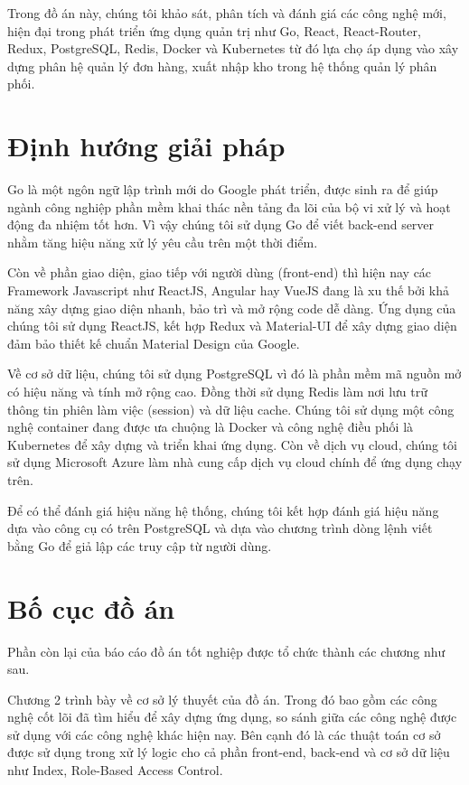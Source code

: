 Trong đồ án này, chúng tôi khảo sát, phân tích và đánh giá các công
nghệ mới, hiện đại trong phát triển ứng dụng quản trị như Go,
React, React-Router, Redux, PostgreSQL, Redis, Docker và Kubernetes
từ đó lựa chọ áp dụng vào xây dựng phân hệ quản lý đơn hàng,
xuất nhập kho trong hệ thống quản lý phân phối.

\section{Định hướng giải pháp}
Go là một ngôn ngữ lập trình mới do Google phát triển,
được sinh ra để giúp ngành công nghiệp phần mềm khai thác nền
tảng đa lõi của bộ vi xử lý và hoạt động đa nhiệm tốt hơn.
Vì vậy chúng tôi sử dụng Go để viết back-end server nhằm tăng hiệu
năng xử lý yêu cầu trên một thời điểm.

Còn về phần giao diện, giao tiếp với người dùng (front-end) thì hiện
nay các Framework Javascript như ReactJS, Angular hay VueJS đang
là xu thế bởi khả năng xây dựng giao diện nhanh, bảo trì và
mở rộng code dễ dàng. Ứng dụng của chúng tôi sử dụng ReactJS, kết hợp Redux và
Material-UI để xây dựng giao diện đảm bảo thiết kế
chuẩn Material Design của Google. 

Về cơ sở dữ liệu, chúng tôi sử dụng PostgreSQL vì đó là phần mềm mã nguồn
mở có hiệu năng và tính mở rộng cao. Đồng thời sử dụng Redis làm nơi lưu
trữ thông tin phiên làm việc (session) và dữ liệu cache.
Chúng tôi sử dụng một công nghệ container đang được
ưa chuộng là Docker và công nghệ điều phối là Kubernetes để xây dựng
và triển khai ứng dụng. Còn về dịch vụ cloud, chúng tôi sử dụng Microsoft
Azure làm nhà cung cấp dịch vụ cloud chính để ứng dụng chạy trên.

Để có thể đánh giá hiệu năng hệ thống, chúng tôi kết hợp đánh giá hiệu năng
dựa vào công cụ có trên PostgreSQL và dựa vào chương trình dòng lệnh viết
bằng Go để giả lập các truy cập từ người dùng.

\section{Bố cục đồ án}
Phần còn lại của báo cáo đồ án tốt nghiệp được tổ
chức thành các chương như sau.

Chương 2 trình bày về cơ sở lý thuyết của đồ án. Trong đó bao gồm
các công nghệ cốt lõi đã tìm hiểu để xây dựng ứng dụng, so sánh
giữa các công nghệ được sử dụng với các công nghệ khác hiện nay.
Bên cạnh đó là các thuật toán cơ sở được sử dụng trong xử lý logic
cho cả phần front-end, back-end và cơ sở dữ liệu như Index,
Role-Based Access Control. 

